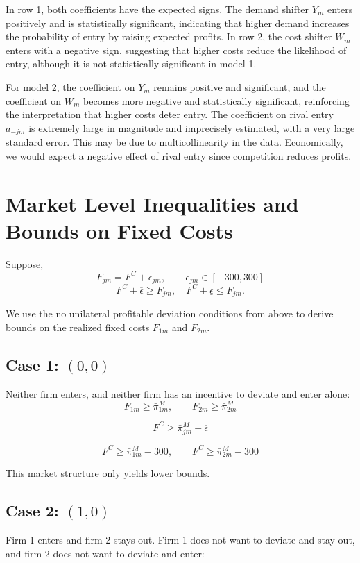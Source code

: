 \documentclass[12pt]{article}
\begin{document}
In row 1, both coefficients have the expected signs. The demand shifter \(Y_m\) enters positively and is statistically significant, indicating that higher demand increases the probability of entry by raising expected profits. In row 2, the cost shifter \(W_m\) enters with a negative sign, suggesting that higher costs reduce the likelihood of entry, although it is not statistically significant in model 1.

For model 2, the coefficient on \(Y_m\) remains positive and significant, and the coefficient on \(W_m\) becomes more negative and statistically significant, reinforcing the interpretation that higher costs deter entry. The coefficient on rival entry \(a_{-jm}\) is extremely large in magnitude and imprecisely estimated, with a very large standard error. This may be due to multicollinearity in the data. Economically, we would expect a negative effect of rival entry since competition reduces profits.

\section{Market Level Inequalities and Bounds on Fixed Costs}
Suppose,
\[
F_{jm} = F^C + \epsilon_{jm},
\qquad \epsilon_{jm} \in [{-300},{300}]
\]
\[
F^C + \overline{\epsilon} \geq F_{jm} , \quad F^C + \underline{\epsilon} \leq F_{jm}.
\]

We use the no unilateral profitable deviation conditions from above to derive bounds on the realized fixed costs \(F_{1m}\) and \(F_{2m}\).

\subsection*{Case 1: \((0,0)\)}

Neither firm enters, and neither firm has an incentive to deviate and enter alone:
\[
F_{1m} \geq \bar{\pi}_{1m}^M,
\qquad
F_{2m} \geq \bar{\pi}_{2m}^M
\]

\[
F^C \geq \bar{\pi}_{jm}^M - \overline{\epsilon}
\]

\[
F^C \geq \bar{\pi}_{1m}^M - 300,
\qquad
F^C \geq \bar{\pi}_{2m}^M - 300
\]

This market structure only yields lower bounds.

\subsection*{Case 2: \((1,0)\)}

Firm 1 enters and firm 2 stays out. Firm 1 does not want to deviate and stay out, and firm 2 does not want to deviate and enter:
\end{document}
